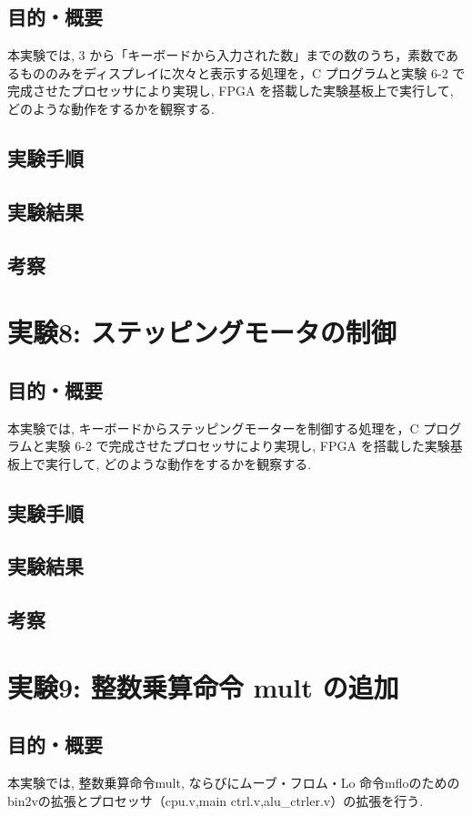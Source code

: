 \documentclass[epsf,a4paper,dvipdfmx,autodetect-engine,titlepage]{jsarticle}
\begin{document}
\subsection{目的・概要}
本実験では, 3 から「キーボードから入力された数」までの数のうち，素数であるもののみをディスプレイに次々と表示する処理を，C プログラムと実験 6-2 で完成させたプロセッサにより実現し, FPGA を搭載した実験基板上で実行して, どのような動作をするかを観察する.
\subsection{実験手順}
\subsection{実験結果}
\subsection{考察}

\section{実験8: ステッピングモータの制御}
\subsection{目的・概要}
本実験では, キーボードからステッピングモーターを制御する処理を，C プログラムと実験
6-2 で完成させたプロセッサにより実現し, FPGA を搭載した実験基板上で実行して, どのような動作をするかを観察する.
\subsection{実験手順}
\subsection{実験結果}
\subsection{考察}

\section{実験9: 整数乗算命令 mult の追加}
\subsection{目的・概要}
本実験では, 整数乗算命令mult, ならびにムーブ・フロム・Lo 命令mfloのためのbin2vの拡張とプロセッサ（cpu.v,main ctrl.v,alu\_ctrler.v）の拡張を行う. 
\end{document}
